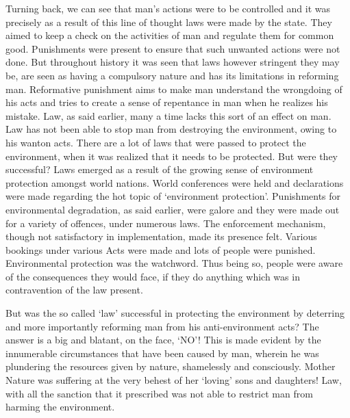 \begin{multicols}{2}
\noi
Turning back, we can see that man’s actions were to be controlled and it was precisely as a
result of this line of thought laws were made by the state. They aimed to keep a check on the
activities of man and regulate them for common good. Punishments were present to ensure that
such unwanted actions were not done. But throughout history it was seen that laws however
stringent they may be, are seen as having a compulsory nature and has its limitations in
reforming man. Reformative punishment aims to make man understand the wrongdoing of his
acts and tries to create a sense of repentance in man when he realizes his mistake. Law, as said
earlier, many a time lacks this sort of an effect on man. Law has not been able to stop man
from destroying the environment, owing to his wanton acts. There are a lot of laws that were
passed to protect the environment, when it was realized that it needs to be protected. But were
they successful? Laws emerged as a result of the growing sense of environment protection
amongst world nations. World conferences were held and declarations were made regarding
the hot topic of ‘environment protection’. Punishments for environmental degradation, as said
earlier, were galore and they were made out for a variety of offences, under numerous laws.
The enforcement mechanism, though not satisfactory in implementation, made its presence
felt. Various bookings under various Acts were made and lots of people were punished.
Environmental protection was the watchword. Thus being so, people were aware of the
consequences they would face, if they do anything which was in contravention of the law
present.


\vspace{-.15cm}

\noi
But was the so called ‘law’ successful in protecting the environment by deterring and more
importantly reforming man from his anti-environment acts? The answer is a big and blatant, on the face, ‘NO’! This is made evident by the innumerable circumstances that have been
caused by man, wherein he was plundering the resources given by nature, shamelessly and
consciously. Mother Nature was suffering at the very behest of her ‘loving’ sons and daughters!
Law, with all the sanction that it prescribed was not able to restrict man from harming the
environment.

\vspace{-.15cm}


\end{multicols}
